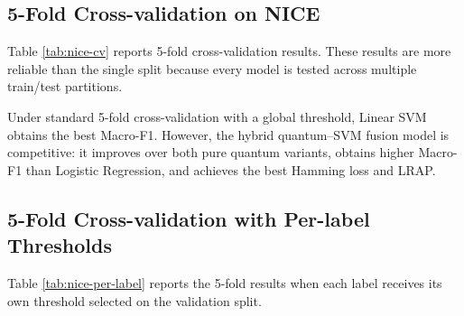 \documentclass[conference]{IEEEtran}
\begin{document}
\subsection{5-Fold Cross-validation on NICE}
Table \ref{tab:nice-cv} reports 5-fold cross-validation results. These results are more reliable than the single split because every model is tested across multiple train/test partitions.

\begin{table}[htbp]
\centering
\caption{NICE 5-fold cross-validation mean results}
\label{tab:nice-cv}
\end{table}

Under standard 5-fold cross-validation with a global threshold, Linear SVM obtains the best Macro-F1. However, the hybrid quantum--SVM fusion model is competitive: it improves over both pure quantum variants, obtains higher Macro-F1 than Logistic Regression, and achieves the best Hamming loss and LRAP.

\subsection{5-Fold Cross-validation with Per-label Thresholds}
Table \ref{tab:nice-per-label} reports the 5-fold results when each label receives its own threshold selected on the validation split.

\begin{table}[htbp]
\centering
\caption{NICE 5-fold results with per-label threshold calibration}
\label{tab:nice-per-label}
\end{table}
\end{document}
